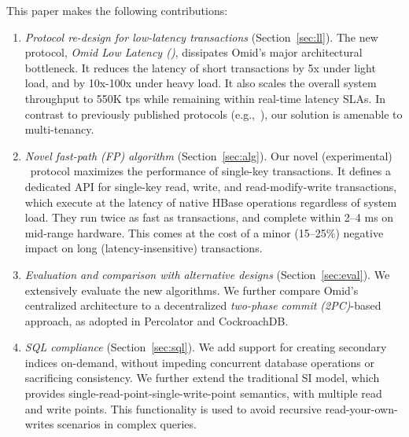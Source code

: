 This paper makes the following contributions: 
\begin{enumerate}
    \setlength{\itemsep}{1pt}
    \setlength{\parskip}{1pt}
    \setlength{\parsep}{1pt}  

\item {\em Protocol re-design for low-latency transactions} (Section~\ref{sec:ll}). 
The new protocol,    \emph{Omid Low Latency (\sysll)}, 
dissipates Omid's major architectural bottleneck. 
It reduces the latency of short transactions by 5x under light load, and 
by 10x-100x under heavy load. %
It also scales 
the overall system throughput to 550K tps while remaining 
within real-time latency SLAs. In contrast to previously published protocols 
(e.g.,~\cite{Percolator2010}), our solution is amenable to multi-tenancy.

\item {\em Novel fast-path (FP) algorithm} (Section~\ref{sec:alg}). 
Our  novel (experimental) \sys\ protocol  
maximizes the performance of  single-key transactions.
It defines a dedicated API for single-key read, 
write, and read-modify-write transactions, which execute at the 
latency of native HBase operations regardless of system load.
They run twice as fast as \sysll\/ transactions, and complete within 2--4 ms on mid-range hardware. 
This comes at the cost of a minor (15--25\%) negative impact on long (latency-insensitive) transactions.  

\item \emph{Evaluation and comparison with alternative designs} (Section~\ref{sec:eval}).
We extensively evaluate the new algorithms. %
We further compare Omid's  centralized architecture  to 
a decentralized \emph{two-phase commit (2PC)}-based approach, as 
 adopted in Percolator and CockroachDB.

\item {\em SQL compliance} (Section~\ref{sec:sql}). 
We add support for creating secondary indices on-demand, 
without impeding concurrent database operations or sacrificing consistency. 
We further extend the traditional SI model, which provides single-read-point-single-write-point
semantics, with multiple read and write points. This functionality is used to avoid recursive 
read-your-own-writes scenarios in complex queries. 


\end{enumerate}

